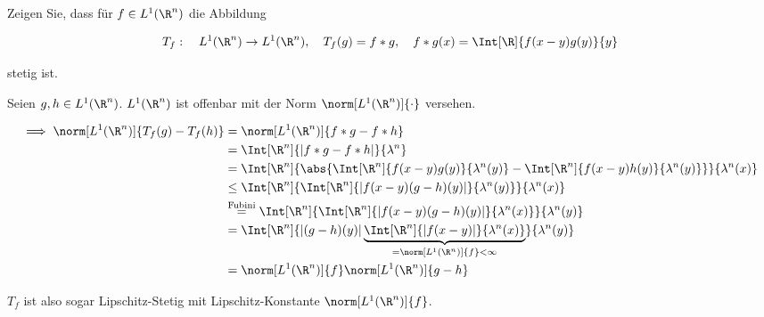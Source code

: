 
\begin{exercise}

Zeigen Sie, dass für $f \in L^1(\R^n)$ die Abbildung

\begin{align*}
    T_f:
    \quad
    L^1(\R^n) \to L^1(\R^n),
    \quad
    T_f(g) = f \ast g,
    \quad
    f \ast g(x) = \Int[\R]{f(x - y) g(y)}{y}
\end{align*}

stetig ist.

\end{exercise}


\begin{solution}

Seien $g, h \in L^1(\R^n)$.
$L^1(\R^n)$ ist offenbar mit der Norm $\norm[L^1(\R^n)]{\cdot}$ versehen.


\begin{align*}
    \implies
    \norm[L^1(\R^n)]{T_f(g) - T_f(h)}
    & =
    \norm[L^1(\R^n)]{f \ast g - f \ast h} \\
    & =
    \Int[\R^n]{|f \ast g - f \ast h|}{\lambda^n} \\
    & =
    \Int[\R^n]
    {
        \abs
        {
            \Int[\R^n]
            {
                f(x - y) g(y)
            }{
                \lambda^n(y)
            }
            -
            \Int[\R^n]
            {
                f(x - y) h(y)
            }{
                \lambda^n(y)
            }
        }
    }{
        \lambda^n(x)
    } \\
    & \leq
    \Int[\R^n]
    {
        \Int[\R^n]
        {
            |f(x - y) (g - h)(y)|
        }{
            \lambda^n(y)
        }
    }{
        \lambda^n(x)
    } \\
    & \stackrel
    {
        \mathrm{Fubini}
    }{=}
    \Int[\R^n]
    {
        \Int[\R^n]
        {
            |f(x - y) (g - h)(y)|
        }{
            \lambda^n(x)
        }
    }{
        \lambda^n(y)
    } \\
    & =
    \Int[\R^n]
    {
        |(g - h)(y)|
        \underbrace
        {
            \Int[\R^n]
            {
                |f(x - y)|
            }{
                \lambda^n(x)
            }
        }_{
            = \norm[L^1(\R^n)]{f} < \infty
        }
    }{
        \lambda^n(y)
    } \\
    & =
    \norm[L^1(\R^n)]{f}
    \norm[L^1(\R^n)]{g - h}
\end{align*}

$T_f$ ist also sogar Lipschitz-Stetig mit Lipschitz-Konstante $\norm[L^1(\R^n)]{f}$.

\end{solution}

